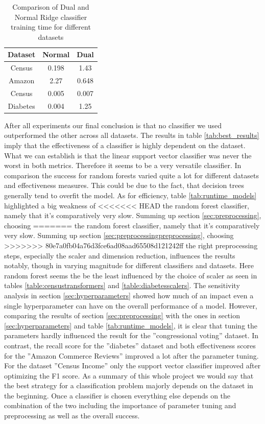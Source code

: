 \documentclass[a4paper,10pt]{article}
\begin{document}
\begin{table}[h!]
\centering
\begin{tabular}{|c|c|c|}
\hline
\textbf{Dataset} & \textbf{Normal} & \textbf{Dual} \\
\hline
Census & 0.198 & 1.43 \\
\hline
Amazon & 2.27 & 0.648 \\
\hline
Census & 0.005 & 0.007 \\
\hline
Diabetes & 0.004 & 1.25 \\
\hline
\end{tabular}
\vspace{0.3cm}
\caption{Comparison of Dual and Normal Ridge classifier training time for different datasets}
\label{tab:dual_comparison}
\end{table}
After all experiments our final conclusion is that no classifier we used outperformed the other across all
datasets. The results in table \ref{tab:best_results} imply that the effectiveness of a classifier is highly dependent on the
dataset. What we can establish is that the linear support vector classifier was never the worst in both
metrics. Therefore it seems to be a very versatile classifier. In comparison the success for random forests
varied quite a lot for different datasets and effectiveness measures. This could be due to the fact, that
decision trees generally tend to overfit the model. As for efficiency, table \ref{tab:runtime_models} highlighted a big weakness of
<<<<<<< HEAD
the random forest classifier, namely that it’s comparatively very slow. Summing up section \ref{sec:preprocessing}, choosing
=======
the random forest classifier, namely that it’s comparatively very slow. Summing up section \ref{sec:preprocessingpreprocessing}, choosing
>>>>>>> 80e7a0fb04a76d3fce6ad08aad65508d121242ff
the right preprocessing steps, especially the scaler and dimension reduction, influences the results notably,
though in varying magnitude for different classifiers and datasets. Here random forest seems the be the
least influenced by the choice of scaler as seen in tables \ref{table:censustransformers} and \ref{table:diabetesscalers}. The sensitivity analysis in section \ref{sec:hyperparameters}
showed how much of an impact even a single hyperparameter can have on the overall performance of a
model. However, comparing the results of section \ref{sec:preprocessing} with the ones in section \ref{sec:hyperparameters} and table \ref{tab:runtime_models}, it is clear that
tuning the parameters hardly influenced the result for the ”congressional voting” dataset. In contrast, the
recall score for the ”diabetes” dataset and both effectiveness scores for the ”Amazon Commerce Reviews”
improved a lot after the parameter tuning. For the dataset ”Census Income” only the support vector
classifier improved after optimizing the F1 score. As a summary of this whole project we would say that
the best strategy for a classification problem majorly depends on the dataset in the beginning. Once a
classifier is chosen everything else depends on the combination of the two including the importance of
parameter tuning and preprocessing as well as the overall success.
\end{document}
